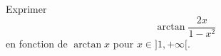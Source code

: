Exprimer 
\begin{displaymath}
 \arctan \frac{2x}{1 - x^2}
\end{displaymath}
en fonction de $\arctan x$ pour $x\in]1,+\infty[$.
\bigskip